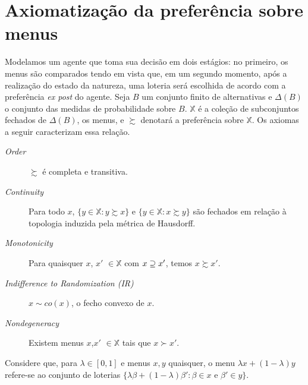 \documentclass[12pt, a4paper]{article}
\theoremstyle{nonumberplain}
\theoremstyle{plain}
\theoremstyle{plain}
\theoremstyle{plain}
\theoremstyle{nonumberplain}
\begin{document}
\section{Axiomatização da preferência sobre menus}
Modelamos um agente que toma sua decisão em dois estágios: no primeiro, os menus são comparados tendo em vista que, em um segundo momento, após a realização do estado da natureza, uma loteria será escolhida de acordo com a preferência \emph{ex post} do agente.
Seja $B$ um conjunto finito de alternativas e $\Delta(B)$ o conjunto das medidas de probabilidade sobre $B$. $\mathbb{X}$ é a coleção de subconjuntos fechados de $\Delta(B)$, os menus, e $\succsim$ denotará a preferência sobre $\mathbb{X}$. Os axiomas a seguir caracterizam essa relação.
\begin{description}
\item [\textit{Order}] $\succsim$ é completa e transitiva.
\item [\textit{Continuity}] Para todo $x$, $\{y\in \mathbb{X}:y\succsim x\}$ e $\{y\in \mathbb{X}:x\succsim y\}$ são fechados em relação à topologia induzida pela métrica de Hausdorff.%
\item [\textit{Monotonicity}] Para quaisquer $x$, $x'$ $\in\mathbb{X}$ com $x\begin{small}\supseteq\end{small} x'$, temos $x\succsim x'$.
\item [\textit{Indifference to Randomization (IR)}] $x\sim co(x)$, o fecho convexo de $x$.
\item [\textit{Nondegeneracy}] Existem menus $x$,$x'$ $\in \mathbb{X}$ tais que $x\succ x'$.
\end{description}
\noindent
Considere que, para $\lambda\in[0,1]$ e menus $x, y$ quaisquer, o menu $\lambda x + (1-\lambda)y$ refere-se ao conjunto de loterias $\{\lambda\beta+(1-\lambda)\beta':\beta\in x\text{ e }\beta'\in y\}$.
\end{document}
